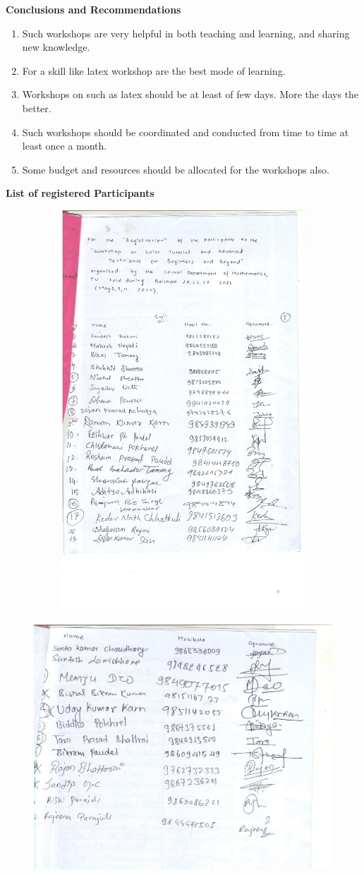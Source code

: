 \documentclass[a4paper,12pt]{report}
\begin{document}
\vspace{4cm}
{\bfseries \Large Conclusions and Recommendations} \vspace{1mm}
\begin{enumerate}
\item Such workshops are very helpful in both teaching and learning, and sharing new knowledge.
\item For a skill like latex workshop are the best mode of learning.
\item Workshops on such as latex should be at least of few days. More the days the better.
\item Such workshops should be coordinated and conducted from time to time at least once a month.
  \item Some budget and resources should be allocated for the workshops also.
\end{enumerate}

\clearpage

{\bfseries \large List of registered Participants}
\begin{figure}[h!]
  \centering
  \includegraphics[width=12cm, height=15cm]{scan1.jpg}
  \includegraphics[width=12cm, height=10cm]{scan2.jpg}
\end{figure}
\end{document}
